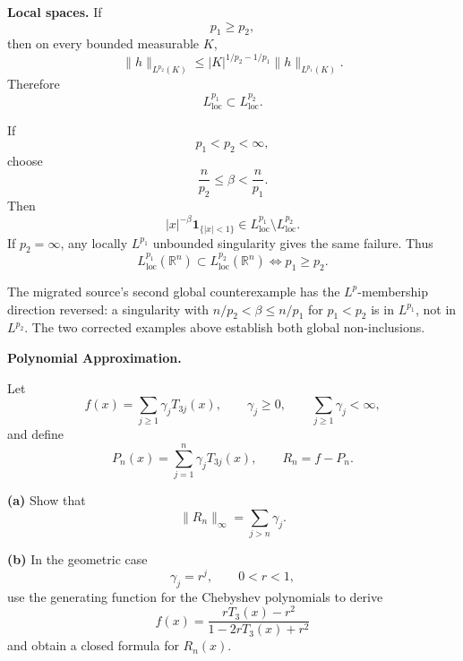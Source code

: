 \begin{solution}
\textbf{Local spaces.}
If
\[
p_1\ge p_2,
\]
then on every bounded measurable \(K\),
\[
\|h\|_{L^{p_2}(K)}
\le
|K|^{1/p_2-1/p_1}
\|h\|_{L^{p_1}(K)}.
\]
Therefore
\[
L^{p_1}_{\mathrm{loc}}
\subset
L^{p_2}_{\mathrm{loc}}.
\]

If
\[
p_1<p_2<\infty,
\]
choose
\[
\frac{n}{p_2}\le\beta<\frac{n}{p_1}.
\]
Then
\[
|x|^{-\beta}\mathbf1_{\{|x|<1\}}
\in
L^{p_1}_{\mathrm{loc}}
\setminus
L^{p_2}_{\mathrm{loc}}.
\]
If \(p_2=\infty\), any locally \(L^{p_1}\) unbounded singularity gives the same failure.
Thus
\[
\boxed{
L^{p_1}_{\mathrm{loc}}(\mathbb R^n)
\subset
L^{p_2}_{\mathrm{loc}}(\mathbb R^n)
\iff
p_1\ge p_2.
}
\]

The migrated source's second global counterexample has the \(L^p\)-membership direction
reversed: a singularity with
\(n/p_2<\beta\le n/p_1\) for \(p_1<p_2\) is in \(L^{p_1}\), not in \(L^{p_2}\).
The two corrected examples above establish both global non-inclusions.
\end{solution}


\begin{problem}[CP-II-0485]
\label{prob:cp-ii-0485}
\textbf{Polynomial Approximation.}

\hspace*{1.5em}Let
\[
f(x)=\sum_{j\ge1}\gamma_jT_{3j}(x),
\qquad
\gamma_j\ge0,
\qquad
\sum_{j\ge1}\gamma_j<\infty,
\]
and define
\[
P_n(x)=\sum_{j=1}^{n}\gamma_jT_{3j}(x),
\qquad
R_n=f-P_n.
\]

\par\noindent\textbf{(a)}\quad
Show that
\[
\|R_n\|_\infty
=
\sum_{j>n}\gamma_j.
\]

\par\noindent\textbf{(b)}\quad
In the geometric case
\[
\gamma_j=r^j,
\qquad 0<r<1,
\]
use the generating function for the Chebyshev polynomials to derive
\[
f(x)
=
\frac{rT_3(x)-r^2}
     {1-2rT_3(x)+r^2}
\]
and obtain a closed formula for \(R_n(x)\).
\end{problem}

